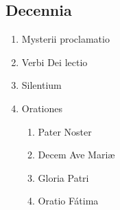 \subsection*{Decennia}

\begin{enumerate}[label={\roman*.}, itemsep=0pt]

\item Mysterii proclamatio
\item Verbi Dei lectio
\item Silentium
\item Orationes
\vspace{-0.5em}
\begin{enumerate}[label={\alph*.}, itemsep=0pt]
    \item Pater Noster
    \item Decem Ave Mariæ
    \item Gloria Patri
    \item Oratio F\'atima
\end{enumerate}
\vspace{-0.5em}
\end{enumerate}